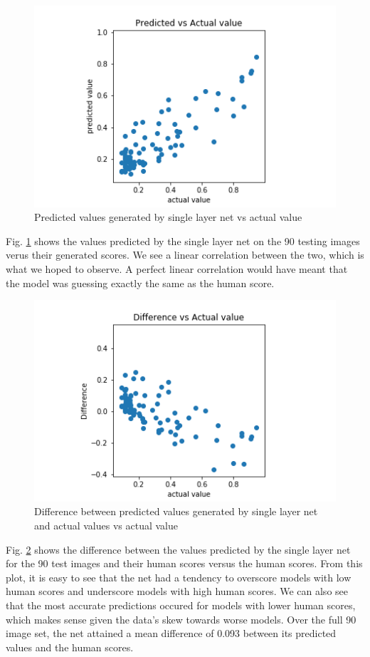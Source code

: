 \documentclass[conference]{IEEEtran}
\begin{document}
\begin{figure}[htbp]
\centerline{\includegraphics[width=0.75\linewidth]{./Images/SinglePredictedVAct.png}}
\caption{Predicted values generated by single layer net vs actual value}
\label{fig:SinglePredictedVAct}
\end{figure}

Fig. \ref{fig:SinglePredictedVAct} shows the values predicted by the single layer net on the 90 testing images verus their generated scores. We see a linear correlation between the two, which is what we hoped to observe. A perfect linear correlation would have meant that the model was guessing exactly the same as the human score.

\begin{figure}[htbp]
\centerline{\includegraphics[width=0.75\linewidth]{./Images/SingleDiffVAct.png}}
\caption{Difference between predicted values generated by single layer net and actual values vs actual value}
\label{fig:SingleDiffVAct}
\end{figure}

Fig. \ref{fig:SingleDiffVAct} shows the difference between the values predicted by the single layer net for the 90 test images and their human scores versus the human scores. From this plot, it is easy to see that the net had a tendency to overscore models with low human scores and underscore models with high human scores. We can also see that the most accurate predictions occured for models with lower human scores, which makes sense given the data's skew towards worse models. Over the full 90 image set, the net attained a mean difference of 0.093 between its predicted values and the human scores.
\end{document}
